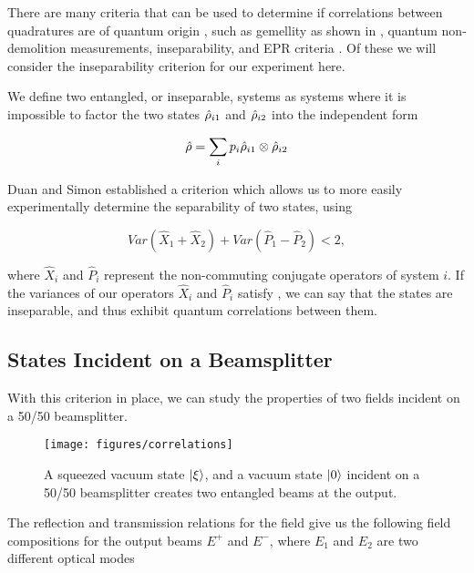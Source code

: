 There are many criteria that can be used to determine if correlations between
quadratures are of quantum origin \cite{treps2005criteria}, such as gemellity
as shown in \cite{Giacobino87}, quantum non-demolition measurements, inseparability, and EPR criteria \cite{Reid88}.  Of these we will consider the inseparability criterion for our experiment here.

We define two entangled, or inseparable, systems as systems where it is impossible to factor the two states $\hat{\rho}_{i1}$ and $\hat{\rho}_{i2}$ into the independent form 

\begin{equation}
  \label{eq:seperable}
  \hat{\rho} = \sum_i p_i \hat{\rho}_{i1} \otimes  \hat{\rho}_{i2}
\end{equation}

\noindent
Duan \cite{duan} and Simon \cite{simon} established a criterion which allows us to more easily experimentally determine the separability of two states, using 


\begin{equation}
  \label{eq:separability}
  Var(\hat{X}_1 + \hat{X}_2) + Var(\hat{P}_1 -\hat{P}_2) < 2     ,
\end{equation}

\noindent
where $\hat{X}_i$ and $\hat{P}_i$ represent the non-commuting conjugate
operators of system $i$. If the variances of our operators $\hat{X}_i$ and
$\hat{P}_i$ satisfy , we can say that the states are inseparable, and thus exhibit quantum correlations between them.  

\subsection{States Incident on a Beamsplitter} 
\label{states_incident_on_a_beamsplitter} 

With this criterion in place, we can study the properties of two fields incident on a 50/50 beamsplitter.

\begin{figure}[!ht] 
 \centering 
 \texttt{[image: figures/correlations]} 
 \caption[Electric fields incident on a beamsplitter]{A squeezed vacuum state
$\left| \xi \right>$, and a vacuum state $\left| 0 \right>$ incident on a 50/50 beamsplitter
creates two entangled beams at the output.}  
 \label{fig:beam_splitter_sep} 
\end{figure}

The reflection and transmission relations for the field give us the following
field compositions for the output beams $E^+$ and $E^-$, where $E_1$ and $E_2$
are two different optical modes

